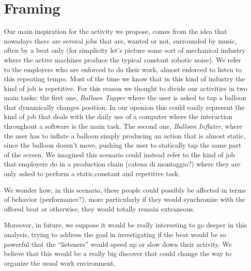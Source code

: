 
\section*{Framing}

Our main inspiration for the activity we propose, comes from the idea that nowadays there are several jobs that are, wanted or not, surrounded by music, often by a beat only (for simplicity let's picture some sort of mechanical industry where the active machines produce the typical constant robotic noise). We refer to the employers who are enforced to do their work, almost enforced to listen to this repeating tempo. Most of the time we know that in this kind of industry the kind of job is repetitive. For this reason we thought to divide our activities in two main tasks: the first one, \textit{Balloon Tapper} where the user is asked to tap a balloon that dynamically changes position. In our oponion this could easily represent the kind of job that deals with the daily use of a computer where the interaction throughout a software is the main task. The second one, \textit{Balloon Inflater}, where the user has to inflate a balloon simply producing an action that is almost static, since the balloon doesn't move, pushing the user to statically tap the same part of the screen. We imagined this scenario could instead refer to the kind of job that employers do in a production chain (catena di montaggio?) where they are only asked to perform a static,constant and repetitive task. 

We wonder how, in this scenario, these people could possibly be affected in terms of behavior (performance?), more particularly if they would synchronize with the offered beat or otherwise, they would totally remain extraneous.

Moreover, in future, we suppose it would be really interesting to go deeper in this analysis, trying to address the goal in investigating if the beat would be so powerful that the ``listeners'' would speed up or slow down their activity. We believe that this would be a really big discover that could change the way to organize the usual work environment,


